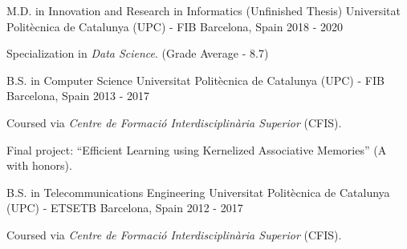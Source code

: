 
\begin{cventries}

\cventry
  {M.D. in Innovation and Research in Informatics (Unfinished Thesis)}
  {Universitat Polit\`ecnica de Catalunya (UPC) - FIB}
  {Barcelona, Spain}
  {2018 - 2020}
  {
    \begin{cvitems}
      \item {Specialization in \textit{Data Science}. (Grade Average - 8.7) }
    \end{cvitems}
  }

\cventry
  {B.S. in Computer Science}
  {Universitat Polit\`ecnica de Catalunya (UPC) - FIB}
  {Barcelona, Spain}
  {2013 - 2017}
  {
    \begin{cvitems}
      \item {Coursed via \textit{Centre de Formaci\'o Interdisciplin\`aria Superior} (CFIS).}
      \item {Final project: ``Efficient Learning using Kernelized Associative Memories'' (A with honors).}
    \end{cvitems}
  }

\cventry
  {B.S. in Telecommunications Engineering}
  {Universitat Polit\`ecnica de Catalunya (UPC) - ETSETB}
  {Barcelona, Spain}
  {2012 - 2017}
  {
    \begin{cvitems}
      \item {Coursed via \textit{Centre de Formaci\'o Interdisciplin\`aria Superior} (CFIS).}
    \end{cvitems}
  }

\end{cventries}
